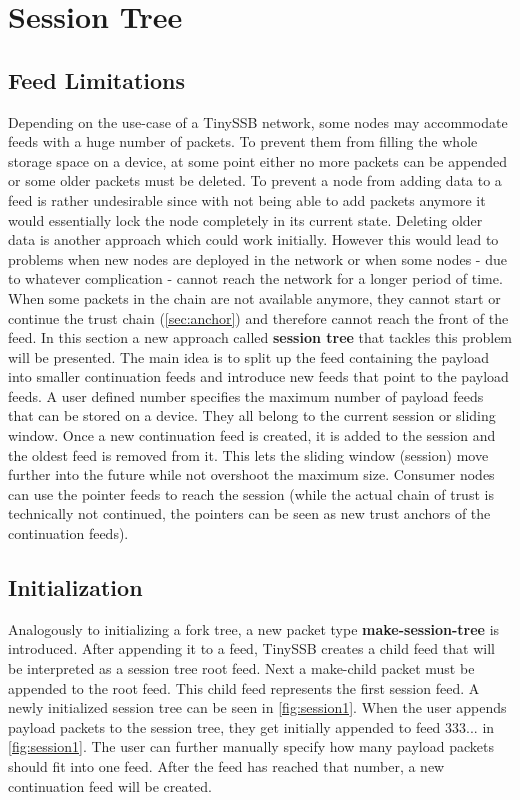 \section{Session Tree}
\label{sec:session}
\subsection{Feed Limitations}
\label{sec:sessionlimit}
Depending on the use-case of a TinySSB network, some nodes may accommodate feeds with a huge number of packets. To prevent them from filling the whole storage space on a device, at some point either no more packets can be appended or some older packets must be deleted. To prevent a node from adding data to a feed is rather undesirable since with not being able to add packets anymore it would essentially lock the node completely in its current state. Deleting older data is another approach which could work initially. However this would lead to problems when new nodes are deployed in the network or when some nodes - due to whatever complication - cannot reach the network for a longer period of time. When some packets in the chain are not available anymore, they cannot start or continue the trust chain (\cref{sec:anchor}) and therefore cannot reach the front of the feed. In this section a new approach called \textbf{session tree} that tackles this problem will be presented. The main idea is to split up the feed containing the payload into smaller continuation feeds and introduce new feeds that point to the payload feeds. A user defined number specifies the maximum number of payload feeds that can be stored on a device. They all belong to the current session or sliding window. Once a new continuation feed is created, it is added to the session and the oldest feed is removed from it. This lets the sliding window (session) move further into the future while not overshoot the maximum size. Consumer nodes can use the pointer feeds to reach the session (while the actual chain of trust is technically not continued, the pointers can be seen as new trust anchors of the continuation feeds).

\subsection{Initialization}
Analogously to initializing a fork tree, a new packet type \textbf{make-session-tree} is introduced. After appending it to a feed, TinySSB creates a child feed that will be interpreted as a session tree root feed. Next a make-child packet must be appended to the root feed. This child feed represents the first session feed. A newly initialized session tree can be seen in \cref{fig:session1}. When the user appends payload packets to the session tree, they get initially appended to feed 333... in \cref{fig:session1}. The user can further manually specify how many payload packets should fit into one feed. After the feed has reached that number, a new continuation feed will be created. 

